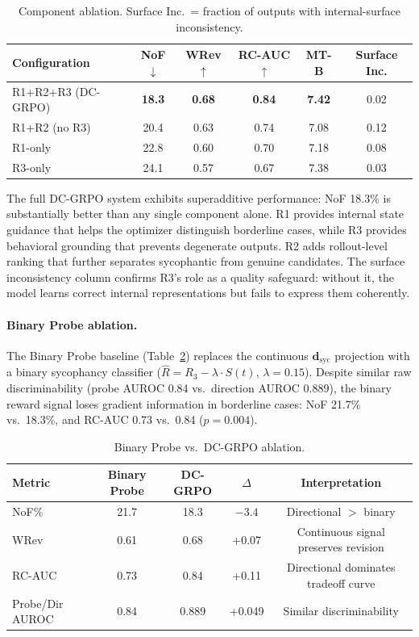 \documentclass[11pt]{article}
\begin{document}
\begin{table}[h]
\centering
\caption{Component ablation. Surface Inc.\ = fraction of outputs with internal-surface inconsistency.}
\label{tab:ablation}
\begin{tabular}{lccccc}
\toprule
Configuration & NoF$\downarrow$ & WRev$\uparrow$ & RC-AUC$\uparrow$ & MT-B & Surface Inc. \\
\midrule
R1+R2+R3 (DC-GRPO) & \textbf{18.3} & \textbf{0.68} & \textbf{0.84} & \textbf{7.42} & 0.02 \\
R1+R2 (no R3)       & 20.4          & 0.63          & 0.74          & 7.08          & 0.12 \\
R1-only              & 22.8          & 0.60          & 0.70          & 7.18          & 0.08 \\
R3-only              & 24.1          & 0.57          & 0.67          & 7.38          & 0.03 \\
\bottomrule
\end{tabular}
\end{table}

The full DC-GRPO system exhibits superadditive performance: NoF 18.3\% is substantially better than any single component alone. R1 provides internal state guidance that helps the optimizer distinguish borderline cases, while R3 provides behavioral grounding that prevents degenerate outputs. R2 adds rollout-level ranking that further separates sycophantic from genuine candidates. The surface inconsistency column confirms R3's role as a quality safeguard: without it, the model learns correct internal representations but fails to express them coherently.

\paragraph{Binary Probe ablation.}
The Binary Probe baseline (Table~\ref{tab:probe_ablation}) replaces the continuous $\mathbf{d}_\text{syc}$ projection with a binary sycophancy classifier ($\hat{R} = R_3 - \lambda \cdot S(t)$, $\lambda = 0.15$). Despite similar raw discriminability (probe AUROC 0.84 vs.\ direction AUROC 0.889), the binary reward signal loses gradient information in borderline cases: NoF 21.7\% vs.\ 18.3\%, and RC-AUC 0.73 vs.\ 0.84 ($p = 0.004$).

\begin{table}[h]
\centering
\caption{Binary Probe vs.\ DC-GRPO ablation.}
\label{tab:probe_ablation}
\begin{tabular}{lcccc}
\toprule
Metric & Binary Probe & DC-GRPO & $\Delta$ & Interpretation \\
\midrule
NoF\%          & 21.7 & 18.3  & $-3.4$ & Directional $>$ binary \\
WRev           & 0.61 & 0.68  & +0.07  & Continuous signal preserves revision \\
RC-AUC         & 0.73 & 0.84  & +0.11  & Directional dominates tradeoff curve \\
Probe/Dir AUROC & 0.84 & 0.889 & +0.049 & Similar discriminability \\
\bottomrule
\end{tabular}
\end{table}
\end{document}
